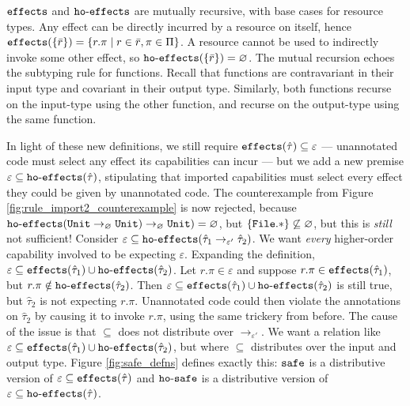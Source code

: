 $\mathtt{effects}$ and $\mathtt{ho \hbox{-} effects}$ are mutually recursive, with base cases for resource types. Any effect can be directly incurred by a resource on itself, hence $\mathtt{effects}(\{ \bar r \}) = \{ r.\pi \mid r \in \bar r, \pi \in \Pi \}$. A resource cannot be used to indirectly invoke some other effect, so $\mathtt{ho \hbox{-} effects}(\{ \bar r \}) = \varnothing$. The mutual recursion echoes the subtyping rule for functions. Recall that functions are contravariant in their input type and covariant in their output type. Similarly, both functions recurse on the input-type using the other function, and recurse on the output-type using the same function.

In light of these new definitions, we still require $\mathtt{effects}(\hat \tau) \subseteq \varepsilon$ --- unannotated code must select any effect its capabilities can incur --- but we add a new premise $\varepsilon \subseteq \mathtt{ho \hbox{-} effects}(\hat \tau)$, stipulating that imported capabilities must select every effect they could be given by unannotated code. The counterexample from Figure \ref{fig:rule_import2_counterexample} is now rejected, because $\mathtt{ho \hbox{-} effects}(\mathtt{Unit} \rightarrow_{\varnothing} \mathtt{Unit}) \rightarrow_{\varnothing} \mathtt{Unit}) = \varnothing$, but $\{ \mathtt{File.*} \} \not\subseteq \varnothing$, but this is \textit{still} not sufficient! Consider $\varepsilon \subseteq \mathtt{ho \hbox{-} effects}( \hat \tau_1 \rightarrow_{\varepsilon'} \hat \tau_2 )$. We want \textit{every} higher-order capability involved to be expecting $\varepsilon$. Expanding the definition, $\varepsilon \subseteq \mathtt{effects}(\hat \tau_1) \cup \mathtt{ho \hbox{-} effects}(\hat \tau_2)$. Let $r.\pi \in \varepsilon$ and suppose $r.\pi \in \mathtt{effects}(\hat \tau_1)$, but $r.\pi \notin \mathtt{ho \hbox{-} effects}(\hat \tau_2)$. Then $\varepsilon \subseteq \mathtt{effects}(\hat \tau_1) \cup \mathtt{ho \hbox{-} effects}(\hat \tau_2)$ is still true, but $\hat \tau_2$ is not expecting $r.\pi$. Unannotated code could then violate the annotations on $\hat \tau_2$ by causing it to invoke $r.\pi$, using the same trickery from before. The cause of the issue is that $\subseteq$ does not distribute over $\rightarrow_{\varepsilon'}$. We want a relation like $\varepsilon \subseteq \mathtt{effects}(\hat \tau_1) \cup \mathtt{ho \hbox{-} effects}(\hat \tau_2)$, but where $\subseteq$ distributes over the input and output type. Figure \ref{fig:safe_defns} defines exactly this: $\mathtt{safe}$ is a distributive version of $\varepsilon \subseteq \mathtt{effects}(\hat \tau)$ and $\mathtt{ho \hbox{-} safe}$ is a distributive version of $\varepsilon \subseteq \mathtt{ho \hbox{-} effects}(\hat \tau)$.


